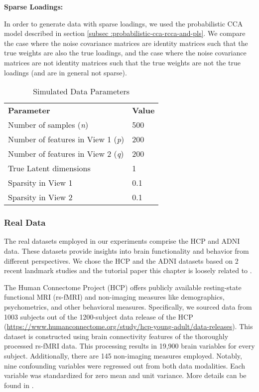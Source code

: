 \textbf{Sparse Loadings:}

In order to generate data with sparse loadings, we used the probabilistic CCA model described in section \ref{subsec
:probabilistic-cca-rcca-and-pls}. We compare the case where the noise covariance matrices are identity matrices such
that the true weights are also the true loadings, and the case where the noise covariance matrices are not identity matrices
such that the true weights are not the true loadings (and are in general not sparse).

\begin{table}[h]
\centering
\caption{Simulated Data Parameters}
\begin{tabular}{| l | l |}
\textbf{Parameter} & \textbf{Value} \\
Number of samples (\textit{n}) & 500 \\
Number of features in View 1 (\textit{p}) & 200 \\
Number of features in View 2 (\textit{q}) & 200 \\
True Latent dimensions & 1 \\
Sparsity in View 1 & 0.1 \\
Sparsity in View 2 & 0.1 \\
\end{tabular}
\end{table}


\subsubsection{Real Data}

The real datasets employed in our experiments comprise the HCP and ADNI data. These datasets provide insights into brain functionality and behavior from different perspectives.
We chose the HCP and the ADNI datasets based on 2
recent landmark studies and the tutorial paper this chapter is loosely related to \cite{mihalik2022canonical}. 


The Human Connectome Project (HCP) offers publicly available resting-state functional MRI (rs-fMRI) and non-imaging
measures like demographics, psychometrics, and other behavioral measures.
Specifically, we sourced data from 1003
subjects out of the 1200-subject data release of the HCP (\url{https://www.humanconnectome.org/study/hcp-young-adult/data-releases}). This dataset is constructed using brain connectivity features of the thoroughly processed rs-fMRI data. This processing results in 19,900 brain variables for every subject. Additionally, there are 145 non-imaging measures employed. Notably, nine confounding variables were regressed out from both data modalities. Each variable was standardized for zero mean and unit variance. More details can be found in \cite{smith2015positive, mihalik2022canonical}.

